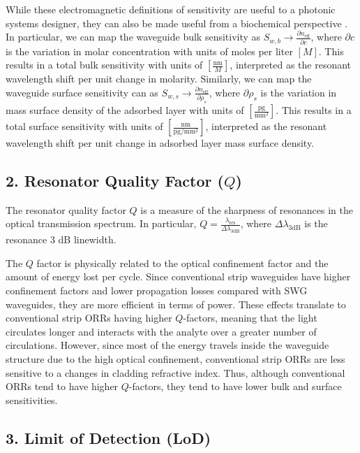 \documentclass[aps,prl,twocolumn, superscriptaddress,nobalancelastpage]{revtex4}
\begin{document}
While these electromagnetic definitions of sensitivity are useful to a photonic systems designer, they can also be made useful from a biochemical perspective \cite{swg1}. In particular, we can map the waveguide bulk sensitivity as $S_{w,b} \to \frac{\partial n_\text{eff}}{\partial c}$, where $\partial c$ is the variation in molar concentration with units of moles per liter $\left[M\right]$. This results in a total bulk sensitivity with units of $\left[\frac{\text{nm}}{M}\right]$, interpreted as the resonant wavelength shift per unit change in molarity. Similarly, we can map the waveguide surface sensitivity can as $S_{w,s} \to \frac{\partial n_\text{eff}}{\partial \rho_s}$, where $\partial \rho_s$ is the variation in mass surface density of the adsorbed layer with units of $\left[\frac{\text{pg}}{\text{mm}^2}\right]$. This results in a total surface sensitivity with units of $\left[\frac{\text{nm}}{\text{pg}/\text{mm}^2}\right]$, interpreted as the resonant wavelength shift per unit change in adsorbed layer mass surface density.
\vspace{-1em}
\subsection{2. Resonator Quality Factor ($Q$)}
\vspace{-1em}
The resonator quality factor $Q$ is a measure of the sharpness of resonances in the optical transmission spectrum. In particular, $Q = \frac{\lambda_\text{res}}{\Delta \lambda_{3\text{dB}}}$, where $\Delta \lambda_{3\text{dB}}$ is the resonance 3 dB linewidth. 

The $Q$ factor is physically related to the optical confinement factor and the amount of energy lost per cycle. Since conventional strip waveguides have higher confinement factors and lower propagation losses compared with SWG waveguides, they are more efficient in terms of power. These effects translate to conventional strip ORRs having higher $Q$-factors, meaning that the light circulates longer and interacts with the analyte over a greater number of circulations. However, since most of the energy travels inside the waveguide structure due to the high optical confinement, conventional strip ORRs are less sensitive to a changes in cladding refractive index. Thus, although conventional ORRs tend to have higher $Q$-factors, they tend to have lower bulk and surface sensitivities. 

\vspace{-1em}
\subsection{3. Limit of Detection (LoD)}
\vspace{-1em}
\end{document}
